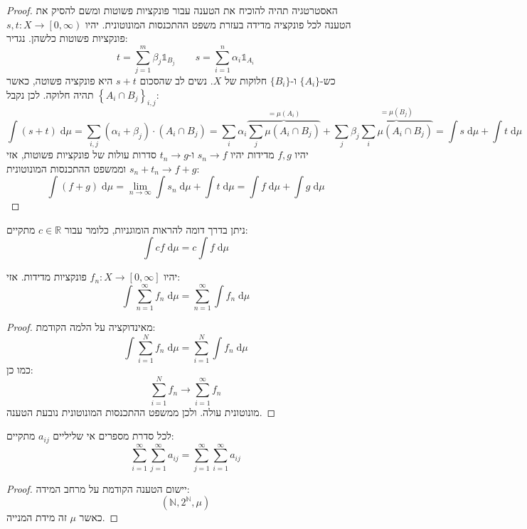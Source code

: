 \documentclass{tstextbook}
\begin{document}
\begin{proof}
האסטרטגיה תהיה להוכיח את הטענה עבור פונקציות פשוטות ומשם להסיק את הטענה לכל פונקציה מדידה בעזרת משפט ההתכנסות המונוטונית.
יהיו \(s,t :X\to \left[ 0,\infty \right)\) פונקציות פשוטות כלשהן. נגדיר:
$$t=\sum_{j=1}^{m} \beta_{j}\mathbb{1} _{B_{j}}\qquad s=\sum_{i=1}^{n} \alpha_{i}\mathbb{1} _{A_{i}}$$
כש-\(\{ A_{i} \}\) ו-\(\{ B_{i} \}\) חלוקות של \(X\). נשים לב שהסכום \(s+t\) היא פונקציה פשוטה, כאשר \(\left\{  A_{i}\cap B_{j}  \right\}_{i,j}\) תהיה חלוקה. לכן נקבל:
$$\int (s+t) \;\mathrm{d} \mu = \sum_{i,j} \left( \alpha_{i}+\beta_{j} \right)\cdot\left( A_{i}\cap B_{j} \right)=\sum_{i}\alpha_{i}\overbrace{ \sum_{j}\mu\left( A_{i}\cap B_{j} \right) }^{ =\mu(A_{i}) }  +\sum_{j}\beta_{j}\overbrace{ \sum_{i}\mu\left( A_{i}\cap B_{j} \right) }^{ =\mu(B_{j}) }=\int s \;\mathrm{d} \mu +\int t \;\mathrm{d} \mu $$
יהיו \(f,g\) מדידות יהיו \(s_{n}\to f\) ו-\(t_{n}\to g\) סדרות עולות של פונקציות פשוטות, אזי \(s_{n}+t_{n}\to f+g\) וממשפט ההתכנסות המונוטונית:
$$\int (f+g) \;\mathrm{d} \mu = \lim_{n\to \infty} \int  s_{n}\;\mathrm{d}\mu + \int t \;\mathrm{d} \mu =\int f \;\mathrm{d} \mu+\int g \;\mathrm{d} \mu  $$

\end{proof}
\begin{corollary}
ניתן בדרך דומה להראות הומוגניות, כלומר עבור \(c \in \mathbb{R}\) מתקיים:
$$\int cf \;\mathrm{d} \mu=c\int f \;\mathrm{d} \mu  $$

\end{corollary}
\begin{proposition}
יהיו \(f_{n}:X\to \left[ 0,\infty \right]\) פונקציות מדידות. אזי:
$$\int \sum_{n=1}^{\infty} f_{n} \;\mathrm{d}\mu= \sum_{n=1}^{\infty}\int  f_{n} \;\mathrm{d} \mu  $$

\end{proposition}
\begin{proof}
מאינדוקציה על הלמה הקודמת:
$$\int \sum_{i=1}^{N} f_{n} \;\mathrm{d} \mu = \sum_{i=1}^{N} \int f_{n} \;\mathrm{d} \mu  $$
כמו כן:
$$\sum_{i=1}^{N} f_{n}\to \sum_{i=1}^{\infty} f_{n}$$
מונוטונית עולה. ולכן ממשפט ההתכנסות המונוטונית נובעת הטענה.

\end{proof}
\begin{corollary}
לכל סדרת מספרים אי שליליים \(a_{ij}\) מתקיים:
$$\sum_{i=1}^{\infty} \sum_{j=1}^{\infty} a_{ij}=\sum_{j=1}^{\infty} \sum_{i=1}^{\infty} a_{ij}
$$

\end{corollary}
\begin{proof}
יישום הטענה הקודמת על מרחב המידה:
$$\left( \mathbb{N},2^{\mathbb{N}}, \mu \right)$$
כאשר \(\mu\) זה מידת המנייה.

\end{proof}
\end{document}
